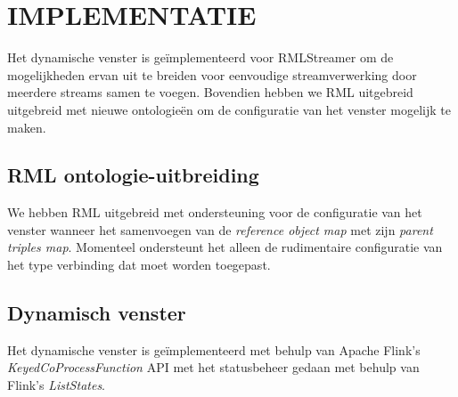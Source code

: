 \section{IMPLEMENTATIE}%
\label{sec:Implementation}

Het dynamische venster is ge\"implementeerd voor RMLStreamer 
om de mogelijkheden ervan uit te breiden voor eenvoudige streamverwerking door 
meerdere streams samen te voegen.  Bovendien hebben we RML uitgebreid
uitgebreid met nieuwe ontologieën om de configuratie van het venster mogelijk te maken. 

\subsection{RML ontologie-uitbreiding}
We hebben RML uitgebreid met ondersteuning voor de configuratie van het venster wanneer
het samenvoegen van de \emph{reference object map} met zijn \emph{parent triples map}. 
Momenteel ondersteunt het alleen de rudimentaire 
configuratie van het type verbinding dat moet worden toegepast.

\subsection{Dynamisch venster}
Het dynamische venster is ge\"implementeerd met behulp van Apache Flink's 
\emph{KeyedCoProcessFunction} API met het statusbeheer 
gedaan met behulp van Flink's \emph{ListStates}.
